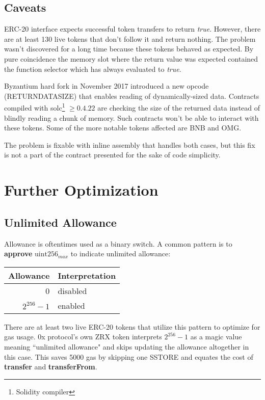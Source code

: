 \documentclass[12pt]{article}
\begin{document}
\subsection{Caveats}

ERC-20 interface expects successful token transfers to return \textit{true}.
However, there are at least 130 live tokens that don't follow it and return nothing.
The problem wasn't discovered for a long time because these tokens behaved as expected\cite{cremer}.
By pure coincidence the memory slot where the return value was expected contained the function selector which has always evaluated to \textit{true}.

Byzantium hard fork in November 2017 introduced a new opcode (RETURNDATASIZE) that enables reading of dynamically-sized data.
Contracts compiled with solc\footnote{Solidity compiler} $\geq 0.4.22$ are checking the size of the returned data instead of blindly reading a chunk of memory.
Such contracts won't be able to interact with these tokens.
Some of the more notable tokens affected are BNB and OMG.

The problem is fixable with inline assembly that handles both cases, but this fix is not a part of the contract presented for the sake of code simplicity.


\section{Further Optimization}

\subsection{Unlimited Allowance}
Allowance is oftentimes used as a binary switch.
A common pattern is to \textbf{approve} $\text{uint256}_{max}$ to indicate unlimited allowance:

\begin{center}	
\begin{tabular}{r l}
	Allowance & Interpretation \\ \hline
	0 & disabled \\
	$2^{256}-1$ & enabled
\end{tabular}
\end{center}

There are at least two live ERC-20 tokens that utilize this pattern to optimize for gas usage.
0x protocol's own ZRX token interprets $2^{256}-1$ as a magic value meaning ``unlimited allowance" and skips updating the allowance altogether in this case\cite{zrx-unlimited}. This saves 5000 gas by skipping one SSTORE and equates the cost of \textbf{transfer} and \textbf{transferFrom}.
\end{document}
